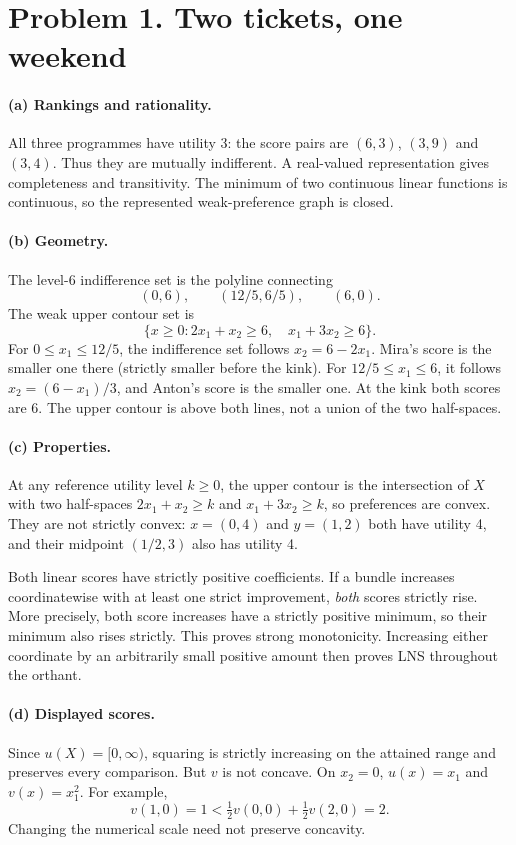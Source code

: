 \section*{Problem 1. Two tickets, one weekend}
\paragraph{(a) Rankings and rationality.} All three programmes have utility 3: the score pairs are $(6,3)$, $(3,9)$ and $(3,4)$. Thus they are mutually indifferent. A real-valued representation gives completeness and transitivity. The minimum of two continuous linear functions is continuous, so the represented weak-preference graph is closed.
\paragraph{(b) Geometry.} The level-6 indifference set is the polyline connecting
\[
 (0,6),\qquad(12/5,6/5),\qquad(6,0).
\]
The weak upper contour set is
\[
 \{x\ge0:2x_1+x_2\ge6,\quad x_1+3x_2\ge6\}.
\]
For $0\le x_1\le12/5$, the indifference set follows $x_2=6-2x_1$. Mira's score is the smaller one there (strictly smaller before the kink). For $12/5\le x_1\le6$, it follows $x_2=(6-x_1)/3$, and Anton's score is the smaller one. At the kink both scores are 6. The upper contour is above both lines, not a union of the two half-spaces.
\paragraph{(c) Properties.} At any reference utility level $k\ge0$, the upper contour is the intersection of $X$ with two half-spaces $2x_1+x_2\ge k$ and $x_1+3x_2\ge k$, so preferences are convex. They are not strictly convex: $x=(0,4)$ and $y=(1,2)$ both have utility 4, and their midpoint $(1/2,3)$ also has utility 4.

Both linear scores have strictly positive coefficients. If a bundle increases coordinatewise with at least one strict improvement, \emph{both} scores strictly rise. More precisely, both score increases have a strictly positive minimum, so their minimum also rises strictly. This proves strong monotonicity. Increasing either coordinate by an arbitrarily small positive amount then proves LNS throughout the orthant.
\paragraph{(d) Displayed scores.} Since $u(X)=[0,\infty)$, squaring is strictly increasing on the attained range and preserves every comparison. But $v$ is not concave. On $x_2=0$, $u(x)=x_1$ and $v(x)=x_1^2$. For example,
\[
 v(1,0)=1<\tfrac12v(0,0)+\tfrac12v(2,0)=2.
\]
Changing the numerical scale need not preserve concavity.
